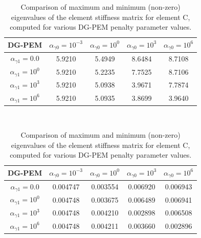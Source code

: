 \begin{table}
\centering
\begin{subtable}{1.0\textwidth}
\centering
\begin{tabular}{| c || c | c | c | c |}
    \hline
DG-PEM & $\alpha_{\gamma0} = 10^{-3}$ & $\alpha_{\gamma0} = 10^{0}$ & $\alpha_{\gamma0} = 10^{3}$ & $\alpha_{\gamma0} = 10^{6}$ \\ \hline \hline
$\alpha_{\gamma1} = 0.0$	& 5.9210 & 5.4949 & 8.6484 & 8.7108 \\ \hline
$\alpha_{\gamma1} = 10^{0}$ & 5.9210 & 5.2235 & 7.7525 & 8.7106 \\ \hline
$\alpha_{\gamma1} = 10^{3}$ & 5.9210 & 5.0938 & 3.9671 & 7.7874 \\ \hline
$\alpha_{\gamma1} = 10^{6}$ & 5.9210 & 5.0935 & 3.8699 & 3.9640 \\
    \hline
    \end{tabular}
    \caption{Largest eigenvalue: $\lambda_{\max}$}
    \label{tab:concave_stiffness_max_eigenvalue_parameter_study}
\end{subtable}%
\\
\begin{subtable}{1.0\textwidth}
\centering
\begin{tabular}{| c || c | c | c | c |}
    \hline
DG-PEM & $\alpha_{\gamma0} = 10^{-3}$	&	$\alpha_{\gamma0} = 10^{0}$	&	$\alpha_{\gamma0} = 10^{3}$	&	$\alpha_{\gamma0} = 10^{6}$ \\ \hline \hline
$\alpha_{\gamma1} = 0.0$	&	0.004747	&	0.003554	&	0.006920	&	0.006943 \\ \hline
$\alpha_{\gamma1} = 10^{0}$	&	0.004748	&	0.003675	&	0.006489	&	0.006941 \\ \hline
$\alpha_{\gamma1} = 10^{3}$	&	0.004748	&	0.004210	&	0.002898	&	0.006508 \\ \hline
$\alpha_{\gamma1} = 10^{6}$	&	0.004748	&	0.004211	&	0.003660	&	0.002896 \\
    \hline
    \end{tabular}
    \caption{Smallest (non-zero) eigenvalue: $\lambda_{\min}$}
    \label{tab:concave_stiffness_min_eigenvalue_parameter_study}
\end{subtable}

\caption{Comparison of maximum and minimum (non-zero) eigenvalues of the element stiffness matrix for element C, computed for various DG-PEM penalty parameter values.}
\label{tab:concave_stiffness_max_min_eigenvalue_parameter_study}
\end{table}

